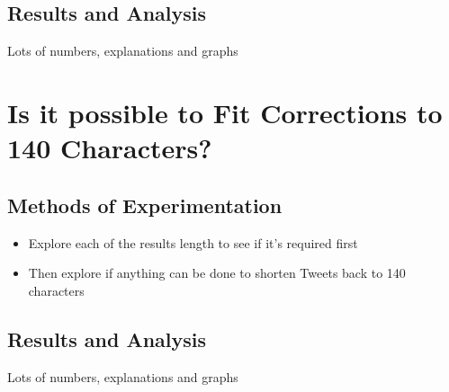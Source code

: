 \subsection{Results and Analysis}
Lots of numbers, explanations and graphs

\section{Is it possible to Fit Corrections to 140 Characters?}
\subsection{Methods of Experimentation}
\begin{itemize}
	\item Explore each of the results length to see if it's required first
	\item Then explore if anything can be done to shorten Tweets back to 140 characters
\end{itemize}

\subsection{Results and Analysis}
Lots of numbers, explanations and graphs
